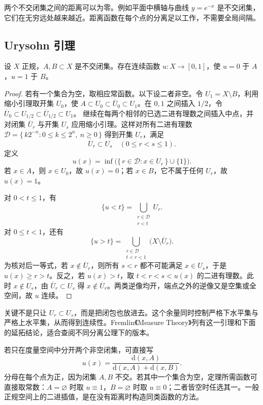 两个不交闭集之间的距离可以为零。例如平面中横轴与曲线 \(y=e^{-x}\) 是不交闭集，它们在无穷远处越来越近。距离函数在每个点的分离足以工作，不需要全局间隔。

\subsection{Urysohn 引理}
\label{b1:subsec:A10402}

\begin{theorem}[Urysohn]\label{b1:thm:app-urysohn}
设 \(X\) 正规，\(A,B\subset X\) 是不交闭集。存在连续函数 \(u:X\rightarrow[0,1]\)，使 \(u=0\) 于 \(A\)，\(u=1\) 于 \(B\)。
\end{theorem}
\begin{proof}
若有一个集合为空，取相应常函数。以下设二者非空。令 \(U_1=X\setminus B\)，利用缩小引理取开集 \(U_0\)，使 \(A\subset U_0\subset\overline U_0\subset U_1\)。在 \(0,1\) 之间插入 \(1/2\)，令
\(\overline U_0\subset U_{1/2}\subset\overline U_{1/2}\subset U_1\)。
继续在每两个相邻的已选二进有理数之间插入中点，并对闭集 \(\overline U_r\) 与开集 \(U_s\) 应用缩小引理。这样对所有二进有理数
\(\mathcal D=\{\,k2^{-n}:0\le k\le2^n,\ n\ge0\,\}\)
得到开集 \(U_r\)，满足
\[
 \overline U_r\subset U_s\quad(0\le r<s\le1).
\]
定义
\[
 u(x)=\inf\bigl(\{\,r\in\mathcal D:x\in U_r\,\}\cup\{1\}\bigr).
\]
若 \(x\in A\)，则 \(x\in U_0\)，故 \(u(x)=0\)；若 \(x\in B\)，它不属于任何 \(U_r\)，故 \(u(x)=1\)。

对 \(0<t\le1\)，有
\[
 \{u<t\}=\bigcup_{\substack{r\in\mathcal D\\r<t}}U_r.
\]
对 \(0\le t<1\)，还有
\[
 \{u>t\}
 =\bigcup_{\substack{r\in\mathcal D\\t<r<1}}
       \bigl(X\setminus\overline U_r\bigr).
\]
为核对后一等式，若 \(x\notin\overline U_r\)，则所有 \(s<r\) 都不可能满足 \(x\in U_s\)，于是 \(u(x)\ge r>t\)。反之，若 \(u(x)>t\)，取 \(t<r<s<u(x)\) 的二进有理数。此时 \(x\notin U_s\)，由 \(\overline U_r\subset U_s\) 得 \(x\notin\overline U_r\)。两类逆像均开，端点之外的逆像又是空集或全空间，故 \(u\) 连续。
\end{proof}

关键不是只让 \(U_r\subset U_s\)，而是把闭包也放进去。这个余量同时控制严格下水平集与严格上水平集，从而得到连续性。Fremlin《Measure Theory》\cite[Appendix to Volume 4, 4A2F(d)]{Fremlin2016Measure}列有这一引理和下面的延拓结论，适合查阅不同分离公理下的版本。

\ProseParagraphBreak

若只在度量空间中分开两个非空闭集，可直接写
\[
 u(x)=\frac{\mathrm{d}(x,A)}{\mathrm{d}(x,A)+\mathrm{d}(x,B)}.
\]
分母在每个点为正，因为闭集 \(A,B\) 不交。若其中一个集合为空，定理所需函数可直接取常数：\(A=\varnothing\) 时取 \(u\equiv1\)，\(B=\varnothing\) 时取 \(u\equiv0\)；二者皆空时任选其一。一般正规空间上的二进插值，是在没有距离时构造同类函数的方法。

